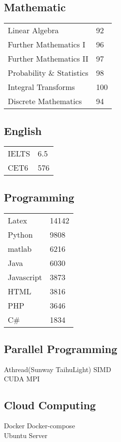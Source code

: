\documentclass[]{deedy-resume-openfont}
\begin{document}
\begin{minipage}[t]{0.25\textwidth}
\subsection{Mathematic }
\begin{tabular}{ll}
    Linear Algebra           & 92  \\
    Further Mathematics I     & 96  \\
    Further Mathematics II     & 97  \\
    Probability \& Statistics   & 98  \\
    Integral Transforms & 100 \\
    Discrete Mathematics & 94 \\
\end{tabular}
\sectionsep
\subsection{English}
\begin{tabular}{ll}
    IELTS & 6.5 \\
    CET6  & 576 \\
\end{tabular}
\sectionsep
\subsection{Programming }
\begin{tabular}{ll}
    Latex      & 14142  \\
    Python     & 9808  \\
    matlab     & 6216  \\
    Java       & 6030  \\
    Javascript & 3873  \\
    HTML       & 3816  \\
    PHP        & 3646  \\
    C\#        & 1834  \\
\end{tabular}
\sectionsep

\subsection{Parallel Programming}
Athread(Sunway TaihuLight) \textbullet{} SIMD \\
CUDA \textbullet{} MPI \\
\sectionsep

\subsection{Cloud Computing}
Docker \textbullet{} Docker-compose \\
Ubuntu Server \\

\end{minipage} 
\end{document}
